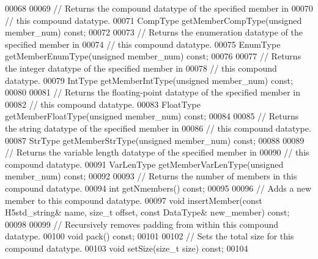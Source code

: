 \begin{DoxyCode}
00068 
00069         \textcolor{comment}{// Returns the compound datatype of the specified member in}
00070         \textcolor{comment}{// this compound datatype.}
00071         CompType getMemberCompType(\textcolor{keywordtype}{unsigned} member\_num) \textcolor{keyword}{const};
00072 
00073         \textcolor{comment}{// Returns the enumeration datatype of the specified member in}
00074         \textcolor{comment}{// this compound datatype.}
00075         EnumType getMemberEnumType(\textcolor{keywordtype}{unsigned} member\_num) \textcolor{keyword}{const};
00076 
00077         \textcolor{comment}{// Returns the integer datatype of the specified member in}
00078         \textcolor{comment}{// this compound datatype.}
00079         IntType getMemberIntType(\textcolor{keywordtype}{unsigned} member\_num) \textcolor{keyword}{const};
00080 
00081         \textcolor{comment}{// Returns the floating-point datatype of the specified member in}
00082         \textcolor{comment}{// this compound datatype.}
00083         FloatType getMemberFloatType(\textcolor{keywordtype}{unsigned} member\_num) \textcolor{keyword}{const};
00084 
00085         \textcolor{comment}{// Returns the string datatype of the specified member in}
00086         \textcolor{comment}{// this compound datatype.}
00087         StrType getMemberStrType(\textcolor{keywordtype}{unsigned} member\_num) \textcolor{keyword}{const};
00088 
00089         \textcolor{comment}{// Returns the variable length datatype of the specified member in}
00090         \textcolor{comment}{// this compound datatype.}
00091         VarLenType getMemberVarLenType(\textcolor{keywordtype}{unsigned} member\_num) \textcolor{keyword}{const};
00092 
00093         \textcolor{comment}{// Returns the number of members in this compound datatype.}
00094         \textcolor{keywordtype}{int} getNmembers() \textcolor{keyword}{const};
00095 
00096         \textcolor{comment}{// Adds a new member to this compound datatype.}
00097         \textcolor{keywordtype}{void} insertMember(\textcolor{keyword}{const} H5std\_string& name, \textcolor{keywordtype}{size\_t} offset, \textcolor{keyword}{const} DataType& new\_member) \textcolor{keyword}{const};
00098 
00099         \textcolor{comment}{// Recursively removes padding from within this compound datatype.}
00100         \textcolor{keywordtype}{void} pack() \textcolor{keyword}{const};
00101 
00102         \textcolor{comment}{// Sets the total size for this compound datatype.}
00103         \textcolor{keywordtype}{void} setSize(\textcolor{keywordtype}{size\_t} size) \textcolor{keyword}{const};
00104 

\end{DoxyCode}
